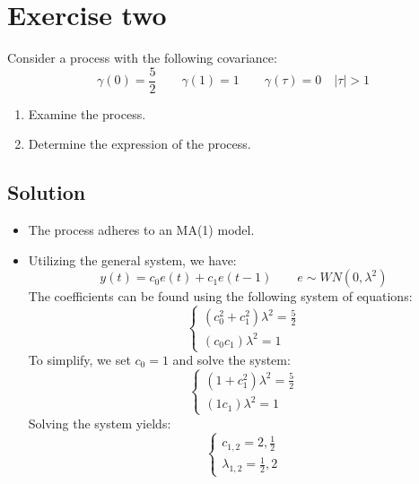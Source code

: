\section{Exercise two}

Consider a process with the following covariance:
\[\gamma(0)=\dfrac{5}{2}\qquad\gamma(1)=1\qquad\gamma(\tau)=0 \quad \left\lvert \tau \right\rvert > 1\]
\begin{enumerate}
    \item Examine the process.
    \item Determine the expression of the process.
\end{enumerate}

\subsection*{Solution}
\begin{itemize}
    \item The process adheres to an MA(1) model.
    \item Utilizing the general system, we have:
        \[y(t)=c_0e(t)+c_1e(t-1)\qquad e\sim WN(0,\lambda^2)\]
        The coefficients can be found using the following system of equations:
        \[\begin{cases}
            \left(c_0^2+c_1^2\right)\lambda^2 = \frac{5}{2} \\
            \left(c_0c_1\right)\lambda^2= 1
        \end{cases}\]
        To simplify, we set $c_0=1$ and solve the system:
        \[\begin{cases}
            \left(1+c_1^2\right)\lambda^2 = \frac{5}{2} \\
            \left(1c_1\right)\lambda^2= 1
        \end{cases}\]
        Solving the system yields:
        \[\begin{cases}
            c_{1,2} = 2, \frac{1}{2} \\
            \lambda_{1,2} = \frac{1}{2}, 2
        \end{cases}\]
\end{itemize}